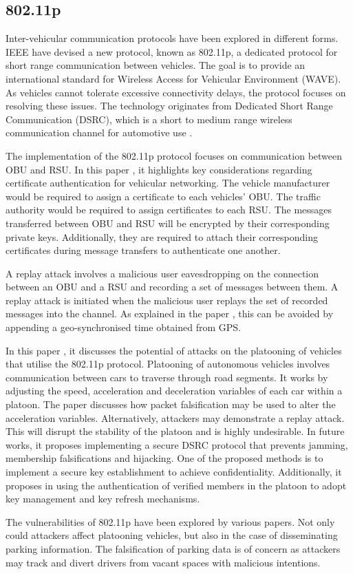 \subsection{802.11p}
Inter-vehicular communication protocols have been explored in different forms. IEEE have devised a new protocol, known as 802.11p, a dedicated protocol for short range communication between vehicles. The goal is to provide an international standard for Wireless Access for Vehicular Environment (WAVE). As vehicles cannot tolerate excessive connectivity delays, the protocol focuses on resolving these issues. The technology originates from Dedicated Short Range Communication (DSRC), which is a short to medium range wireless communication channel for automotive use \cite{dsrc}.

The implementation of the 802.11p protocol focuses on communication between \ac{OBU} and \ac{RSU}. In this paper \citep{Panayappan2007VANET-basedAvailability}, it highlights key considerations regarding certificate authentication for vehicular networking. The vehicle manufacturer would be required to assign a certificate to each vehicles' \ac{OBU}. The traffic authority would be required to assign certificates to each \ac{RSU}. The messages transferred between \ac{OBU} and \ac{RSU} will be encrypted by their corresponding private keys. Additionally, they are required to attach their corresponding certificates during message transfers to authenticate one another.

A replay attack involves a malicious user eavesdropping on the connection between an \ac{OBU} and a \ac{RSU} and recording a set of messages between them. A replay attack is initiated when the malicious user replays the set of recorded messages into the channel. As explained in the paper \citep{Panayappan2007VANET-basedAvailability}, this can be avoided by appending a geo-synchronised time obtained from GPS.

In this paper \cite{ucar_security_2016}, it discusses the potential of attacks on the platooning of vehicles that utilise the 802.11p protocol. Platooning of autonomous vehicles involves communication between cars to traverse through road segments. It works by adjusting the speed, acceleration and deceleration variables of each car within a platoon. The paper discusses how packet falsification may be used to alter the acceleration variables. Alternatively, attackers may demonstrate a replay attack. This will disrupt the stability of the platoon and is highly undesirable. In future works, it proposes implementing a secure DSRC protocol that prevents jamming, membership falsifications and hijacking. One of the proposed methods is to implement a secure key establishment to achieve confidentiality. Additionally, it proposes in using the authentication of verified members in the platoon to adopt key management and key refresh mechanisms.

The vulnerabilities of 802.11p have been explored by various papers. Not only could attackers affect platooning vehicles, but also in the case of disseminating parking information. The falsification of parking data is of concern as attackers may track and divert drivers from vacant spaces with malicious intentions.